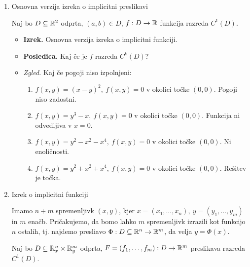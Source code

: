 \begin{enumerate}
    \item Osnovna verzija izreka o implicitni preslikavi
    
    Naj bo $D \subseteq \mathbb{R}^2$ odprta, $(a, b) \in D$, $f: D \to \mathbb{R}$ funkcija razreda $C^1(D)$.
    \begin{itemize}
        \item \colorbox{blue!30}{\textbf{Izrek.}} Osnovna verzija izreka o implicitni funkciji. \todo{*}
        \item \colorbox{orange!30}{\textbf{Posledica.}} Kaj če je $f$ razreda $C^k(D)$?
        \item \colorbox{yellow!30}{\emph{Zgled.}} Kaj če pogoji niso izpolnjeni:
        \begin{enumerate}
            \item $f(x,y) = (x-y)^2, \ f(x,y) = 0$ v okolici točke $(0,0)$. Pogoji niso zadostni.
            \item $f(x,y) = y^3-x, \ f(x,y) = 0$ v okolici točke $(0,0)$. Funkcija ni odvedljiva v \(x = 0\).
            \item $f(x,y) = y^2-x^2-x^4, \ f(x,y) = 0$ v okolici točke $(0,0)$. Ni enoličnosti.
            \item $f(x,y) = y^2+x^2+x^4,  \ f(x,y) = 0$ v okolici točke $(0,0)$. Rešitev je točka.
        \end{enumerate}
    \end{itemize}

    \item Izrek o implicitni funkciji
    
    Imamo $n+m$ spremenljivk $(x,y)$, kjer $x = (x_1, \ldots, x_n), \ y = (y_1, \ldots, y_m)$ in $m$ enačb. Pričakujemo, da bomo lahko $m$ spremenljivk izrazili kot funkcijo $n$ ostalih, tj. najdemo presliavo $\Phi: D \subseteq \mathbb{R}^n \to \mathbb{R}^m$, da velja $y = \Phi(x)$.

    Naj bo $D \subseteq \mathbb{R}^n_x \times \mathbb{R}^m_y$ odprta, $F = (f_1, \ldots, f_m): D \to \mathbb{R}^m$ preslikava razreda $C^1(D)$.


\end{enumerate}

